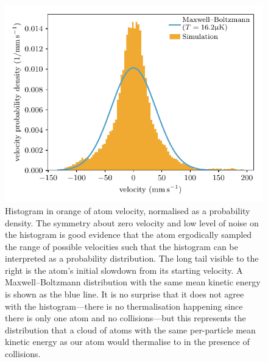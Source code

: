\begin{figure}
\begin{center}
\includegraphics[width=\textwidth]{figures/velocimetry/laser_cooling_results.pdf}
\caption{\label{fig:cold_atom} Histogram in orange of atom velocity, normalised as a probability density. The symmetry about zero velocity and low level of noise on the histogram is good evidence that the atom ergodically sampled the range of possible velocities such that the histogram can be interpreted as a probability distribution. The long tail visible to the right is the atom's initial slowdown from its starting velocity. A Maxwell--Boltzmann distribution with the same mean kinetic energy is shown as the blue line. It is no surprise that it does not agree with the histogram---there is no thermalisation happening since there is only one atom and no collisions---but this represents the distribution that a cloud of atoms with the same per-particle mean kinetic energy as our atom would thermalise to in the presence of collisions.}
\end{center}
\end{figure}

